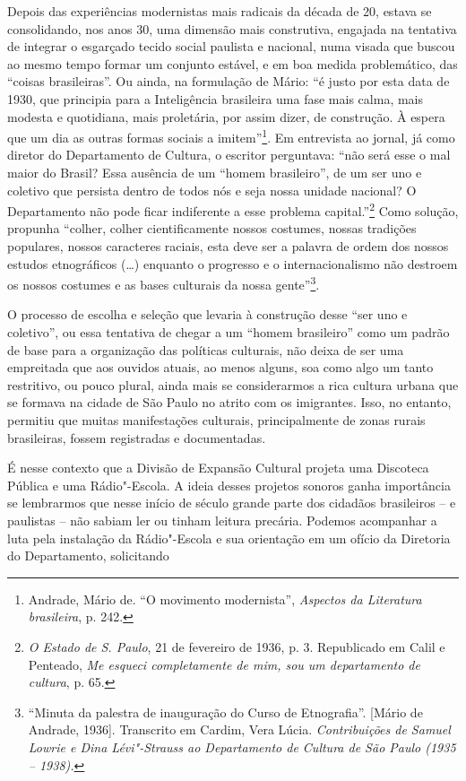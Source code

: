 Depois das experiências modernistas mais radicais da década de 20,
estava se consolidando, nos anos 30, uma dimensão mais construtiva,
engajada na tentativa de integrar o esgarçado tecido social paulista e
nacional, numa visada que buscou ao mesmo tempo formar um conjunto
estável, e em boa medida problemático, das ``coisas brasileiras''. Ou
ainda, na formulação de Mário: ``é justo por esta data de 1930, que
principia para a Inteligência brasileira uma fase mais calma, mais
modesta e quotidiana, mais proletária, por assim dizer, de construção. À
espera que um dia as outras formas sociais a imitem''\footnote{Andrade,
  Mário de. ``O movimento modernista'', \emph{Aspectos da Literatura
  brasileira}, p. 242.}. Em entrevista ao jornal, já como diretor do
Departamento de Cultura, o escritor perguntava: ``não será esse o mal
maior do Brasil? Essa ausência de um ``homem brasileiro'', de um ser uno
e coletivo que persista dentro de todos nós e seja nossa unidade
nacional? O Departamento não pode ficar indiferente a esse problema
capital.''\footnote{\emph{O Estado de S. Paulo}, 21 de fevereiro de
  1936, p. 3. Republicado em Calil e Penteado, \emph{Me esqueci
  completamente de mim, sou um departamento de cultura}, p. 65.} Como
solução, propunha ``colher, colher cientificamente nossos costumes,
nossas tradições populares, nossos caracteres raciais, esta deve ser a
palavra de ordem dos nossos estudos etnográficos (\ldots{}) enquanto o
progresso e o internacionalismo não destroem os nossos costumes e as
bases culturais da nossa gente''\footnote{``Minuta da palestra de
  inauguração do Curso de Etnografia''. {[}Mário de Andrade, 1936{]}.
  Transcrito em Cardim, Vera Lúcia. \emph{Contribuições de Samuel Lowrie
  e Dina Lévi"-Strauss ao Departamento de Cultura de São Paulo (1935 --
  1938).}}.

O processo de escolha e seleção que levaria à construção desse ``ser uno
e coletivo'', ou essa tentativa de chegar a um ``homem brasileiro'' como
um padrão de base para a organização das políticas culturais, não deixa
de ser uma empreitada que aos ouvidos atuais, ao menos alguns, soa como
algo um tanto restritivo, ou pouco plural, ainda mais se considerarmos a
rica cultura urbana que se formava na cidade de São Paulo no atrito com
os imigrantes. Isso, no entanto, permitiu que muitas manifestações
culturais, principalmente de zonas rurais brasileiras, fossem
registradas e documentadas.

É nesse contexto que a Divisão de Expansão Cultural projeta uma
Discoteca Pública e uma Rádio"-Escola. A ideia desses projetos sonoros
ganha importância se lembrarmos que nesse início de século grande parte
dos cidadãos brasileiros -- e paulistas -- não sabiam ler ou tinham
leitura precária. Podemos acompanhar a luta pela instalação da
Rádio"-Escola e sua orientação em um ofício da Diretoria do Departamento,
solicitando

